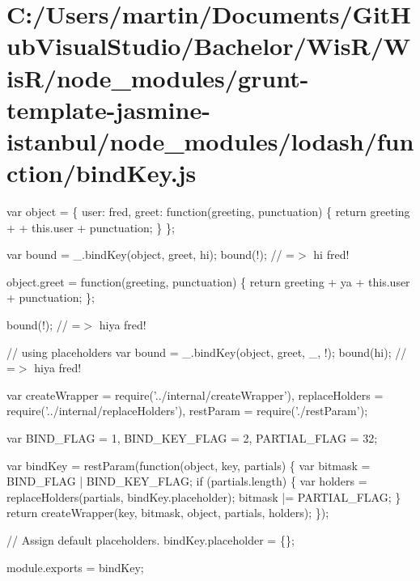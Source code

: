 \hypertarget{_c_1_2_users_2martin_2_documents_2_git_hub_visual_studio_2_bachelor_2_wis_r_2_wis_r_2node_modulee430710d77953569ac6ff4645e79db2b}{}\section{C\+:/\+Users/martin/\+Documents/\+Git\+Hub\+Visual\+Studio/\+Bachelor/\+Wis\+R/\+Wis\+R/node\+\_\+modules/grunt-\/template-\/jasmine-\/istanbul/node\+\_\+modules/lodash/function/bind\+Key.\+js}
var object = \{ \textquotesingle{}user\textquotesingle{}\+: \textquotesingle{}fred\textquotesingle{}, \textquotesingle{}greet\textquotesingle{}\+: function(greeting, punctuation) \{ return greeting + \textquotesingle{} \textquotesingle{} + this.\+user + punctuation; \} \};

var bound = \+\_\+.\+bind\+Key(object, \textquotesingle{}greet\textquotesingle{}, \textquotesingle{}hi\textquotesingle{}); bound(\textquotesingle{}!\textquotesingle{}); // =$>$ \textquotesingle{}hi fred!\textquotesingle{}

object.\+greet = function(greeting, punctuation) \{ return greeting + \textquotesingle{}ya \textquotesingle{} + this.\+user + punctuation; \};

bound(\textquotesingle{}!\textquotesingle{}); // =$>$ \textquotesingle{}hiya fred!\textquotesingle{}

// using placeholders var bound = \+\_\+.\+bind\+Key(object, \textquotesingle{}greet\textquotesingle{}, \+\_\+, \textquotesingle{}!\textquotesingle{}); bound(\textquotesingle{}hi\textquotesingle{}); // =$>$ \textquotesingle{}hiya fred!\textquotesingle{}


\begin{DoxyCodeInclude}
var createWrapper = require(\textcolor{stringliteral}{'../internal/createWrapper'}),
    replaceHolders = require(\textcolor{stringliteral}{'../internal/replaceHolders'}),
    restParam = require(\textcolor{stringliteral}{'./restParam'});

var BIND\_FLAG = 1,
    BIND\_KEY\_FLAG = 2,
    PARTIAL\_FLAG = 32;

var bindKey = restParam(\textcolor{keyword}{function}(\textcolor{keywordtype}{object}, key, partials) \{
  var bitmask = BIND\_FLAG | BIND\_KEY\_FLAG;
  \textcolor{keywordflow}{if} (partials.length) \{
    var holders = replaceHolders(partials, bindKey.placeholder);
    bitmask |= PARTIAL\_FLAG;
  \}
  \textcolor{keywordflow}{return} createWrapper(key, bitmask, \textcolor{keywordtype}{object}, partials, holders);
\});

\textcolor{comment}{// Assign default placeholders.}
bindKey.placeholder = \{\};

module.exports = bindKey;
\end{DoxyCodeInclude}
 
